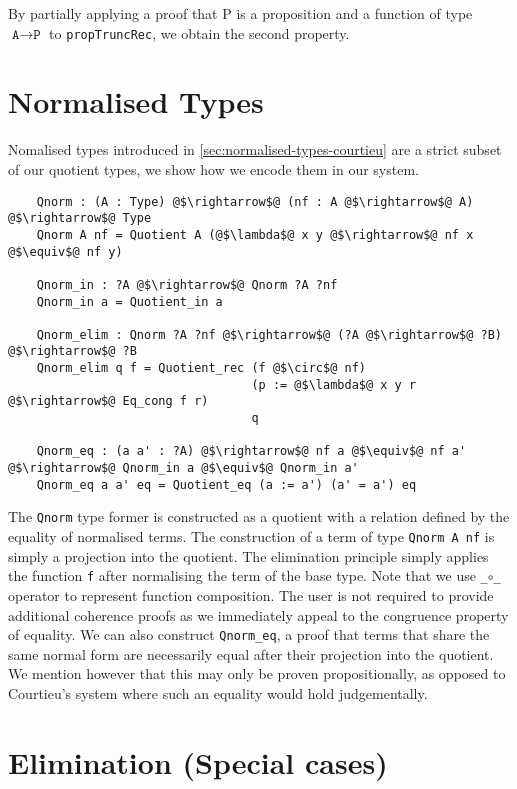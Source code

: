 \documentclass[12pt,twoside,maitrise]{dms}
\theoremstyle{definition}
\numberwithin{equation}{section}
\numberwithin{table}{chapter}
\numberwithin{figure}{chapter}
\newcommand\id[1] {\texttt{#1}}
\newcommand\fn[1] {\texttt{#1}}
\begin{document}
By partially applying a proof that P is a proposition and a function of type
$\id{A} \rightarrow \id{P}$ to \id{propTruncRec}, we obtain the second property.

\section{Normalised Types}

Nomalised types introduced in \autoref{sec:normalised-types-courtieu} are a
strict subset of our quotient types, we show how we encode them in our system.

\begin{verbatim}
    Qnorm : (A : Type) @$\rightarrow$@ (nf : A @$\rightarrow$@ A) @$\rightarrow$@ Type
    Qnorm A nf = Quotient A (@$\lambda$@ x y @$\rightarrow$@ nf x @$\equiv$@ nf y)

    Qnorm_in : ?A @$\rightarrow$@ Qnorm ?A ?nf
    Qnorm_in a = Quotient_in a

    Qnorm_elim : Qnorm ?A ?nf @$\rightarrow$@ (?A @$\rightarrow$@ ?B) @$\rightarrow$@ ?B
    Qnorm_elim q f = Quotient_rec (f @$\circ$@ nf)
                                  (p := @$\lambda$@ x y r @$\rightarrow$@ Eq_cong f r)
                                  q

    Qnorm_eq : (a a' : ?A) @$\rightarrow$@ nf a @$\equiv$@ nf a' @$\rightarrow$@ Qnorm_in a @$\equiv$@ Qnorm_in a'
    Qnorm_eq a a' eq = Quotient_eq (a := a') (a' = a') eq
\end{verbatim}

The \id{Qnorm} type former is constructed as a quotient with a relation defined
by the equality of normalised terms. The construction of a term of type
\id{Qnorm A nf} is simply a projection into the quotient. The elimination
principle simply applies the function \id{f} after normalising the term of the
base type. Note that we use \fn{_$\circ$_} operator to represent function
composition. The user is not required to provide additional coherence proofs as
we immediately appeal to the congruence property of equality. We can also
construct \id{Qnorm\_eq}, a proof that terms that share the same normal form are
necessarily equal after their projection into the quotient. We mention however
that this may only be proven propositionally, as opposed to Courtieu's system
where such an equality would hold judgementally.

\section{Elimination (Special cases)}
\end{document}
